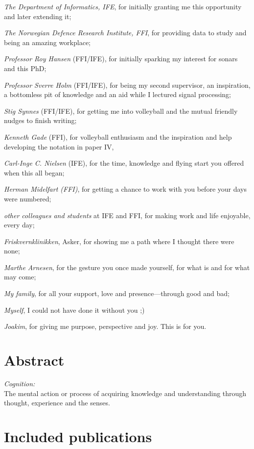 \emph{The Department of Informatics, IFE}, for initially granting me this opportunity and later extending it;

\emph{The Norwegian Defence Research Institute, FFI}, for providing data to study and being an amazing workplace;

\emph{Professor Roy Hansen} (FFI/IFE), for initially sparking my interest for sonars and this PhD;

\emph{Professor Sverre Holm} (FFI/IFE), for being my second supervisor, an inspiration, a bottomless pit of knowledge and an aid while I lectured signal processing;

\emph{Stig Synnes} (FFI/IFE), for getting me into volleyball and the mutual friendly nudges to finish writing;

\emph{Kenneth Gade} (FFI), for volleyball enthusiasm and the inspiration and help developing the notation in paper IV,

\emph{Carl-Inge C. Nielsen} (IFE), for the time, knowledge and flying start you offered when this all began;

\emph{Herman Midelfart (FFI)}, for getting a chance to work with you before your days were numbered;

\emph{other colleagues and students} at IFE and FFI, for making work and life enjoyable, every day;

\emph{Friskvernklinikken}, Asker, for showing me a path where I thought there were none;

\emph{Marthe Arnesen}, for the gesture you once made yourself, for what is and for what may come;

\emph{My family}, for all your support, love and presence---through good and bad;

\emph{Myself}, I could not have done it without you ;)

\emph{Joakim}, for giving me purpose, perspective and joy. This is for you. 



\newpage
\chapter*{Abstract}

\textit{Cognition:}\\The mental action or process of acquiring knowledge and understanding through thought, experience and the senses.

\newpage
\chapter*{Included publications}

